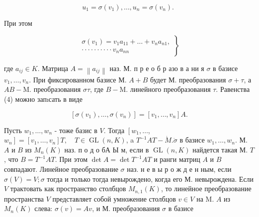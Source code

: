 \documentclass[10pt]{article}
\begin{document}
\[

u_{1}=\sigma\left(v_{1}\right), \ldots, u_{n}=\sigma\left(v_{n}\right) \text {. }

\]



При этом



\[

\left.\begin{array}{l}

\sigma\left(v_{1}\right)=v_{1} a_{11}+\ldots+v_{n} a_{n 1}, \\

\cdot \cdot \cdot \cdot \cdot \cdot \cdot \cdot \cdot \cdot v_{n} a_{n n}

\end{array}\right\}

\]



где $a_{i j} \in K$. Матрица $A=\left\|a_{i j}\right\|$ наз. М. п р е о б р азо в а ни я $\sigma$ в базисе $v_{1}, \ldots, v_{n}$. При фиксированном базисе М. $A+B$ будет М. преобразования $\sigma+\tau$, а $A B-\mathrm{M}$. преобразования $\sigma \tau$, где $B-\mathrm{M}$. линейного преобразования $\tau$. Равенства (4) можно запıсать в виде



\[

\left[\sigma\left(v_{1}\right), \ldots, \sigma\left(v_{n}\right)\right]=\left[v_{1}, \ldots, v_{n}\right] A .

\]



Пусть $w_{1}, \ldots, w_{n}$ - тоже базис в $V$. Тогда $\left[w_{1}, \ldots\right.$, $\left.w_{n}\right]=\left[v_{1}, \ldots, v_{n}\right] T, \quad T \in \operatorname{GL}(n, K)$, a $T^{-1} A T-\dot{M} . \dot{\sigma}$ в базисе $w_{1}, \ldots, w_{n}$. М. $A$ и $B$ из $M_{n}(K)$ наз. п о д о бА Ы м, если в $\operatorname{GL}(n, K)$ найдется такая М. $T$, что $B=T^{-1} A T$. При этом $\operatorname{det} A=\operatorname{det} T^{-1} A T$ и ранги матриц $A$ и $B$ совпадают. Линейное преобразование $\sigma$ наз. н е в ы р о ж д е н ным, если $\sigma(V)=V ; \sigma$ тогда и только тогда невырождено, когда его М. невырождена. Если $V$ трактовать как пространство столбцов $M_{n, 1}(K)$, то линейное преобразование пространства $V$ представляет собой умножение столбцов $v \in V$ на $\mathrm{M}$. $A$ из $M_{n}(K)$ слева: $\sigma(v)=A v$, и М. преобразования $\sigma$ в базисе
\end{document}
